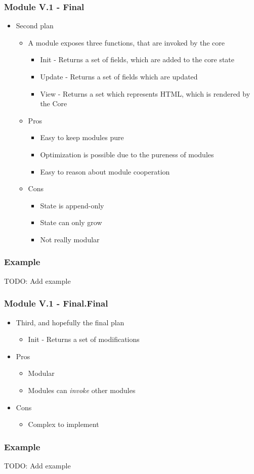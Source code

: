 \begin{frame}
  \frametitle{Module V.1 - Final}
  \begin{itemize}
    \item Second plan
    \begin{itemize}
      \item A module exposes three functions, that are invoked by the core
      \begin{itemize}
        \item Init - Returns a set of fields, which are added to the core state
        \item Update - Returns a set of fields which are updated
        \item View - Returns a set which represents HTML, which is rendered by
          the Core
      \end{itemize}
      \item Pros
      \begin{itemize}
        \item Easy to keep modules pure
        \item Optimization is possible due to the pureness of modules
        \item Easy to reason about module cooperation
      \end{itemize}
      \item Cons
      \begin{itemize}
        \item State is append-only
        \item State can only grow
        \item Not really modular
      \end{itemize}
    \end{itemize}
  \end{itemize}
\end{frame}

\begin{frame}
  \frametitle{Example}
  TODO: Add example
\end{frame}

\begin{frame}
  \frametitle{Module V.1 - Final.Final}
  \begin{itemize}
    \item Third, and hopefully the final plan
      \begin{itemize}
        \item Init - Returns a set of modifications
      \end{itemize}
    \item Pros
    \begin{itemize}
      \item Modular
      \item Modules can \textit{invoke} other modules
    \end{itemize}
    \item Cons
    \begin{itemize}
      \item Complex to implement
    \end{itemize}
  \end{itemize}
\end{frame}

\begin{frame}
  \frametitle{Example}
  TODO: Add example
\end{frame}
